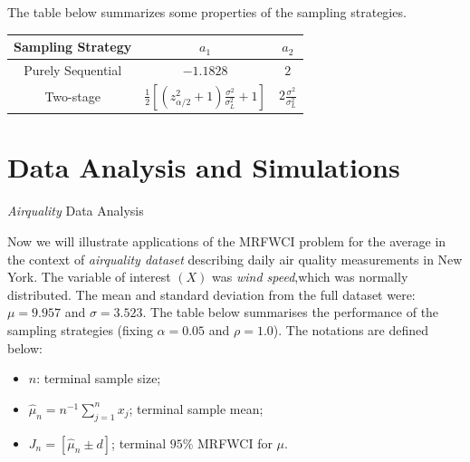 \documentclass [xcolor=svgnames, t] {beamer}
\begin{document}
\begin{frame}{}
    \vspace{20mm}
    The table below summarizes some properties of the sampling strategies.
\begin{center}
\begin{tabular}{c c c} 
 \hline
 Sampling Strategy & $a_1$ & $a_2$ \\
 \hline
 Purely Sequential & $-1.1828$ & $2$  \\ 
 Two-stage & $\frac{1}{2}[(z^2_{\alpha/2}+1)\frac{\sigma^2}{\sigma^2_L}+1]$ & $2\frac{\sigma^2}{\sigma^2_L}$ \\
 \hline
\end{tabular}
\end{center}
\end{frame}
\section{Data Analysis and Simulations}
\begin{frame}{\textit{Airquality} Data Analysis}

Now we will illustrate applications of the MRFWCI problem for the average in the context of \textit{airquality dataset} describing daily air quality measurements in New York. The variable of interest $(X)$ was \textit{wind speed},which was normally distributed. The mean and standard deviation from the full dataset were: $\mu = 9.957$ and $\sigma = 3.523$. The table below summarises the performance of the sampling strategies (fixing $\alpha=0.05$ and $\rho=1.0$). The notations are defined below:
\begin{itemize}
\item $n$: terminal sample size;
\item $\hat{\mu}_n=n^{-1}\sum_{j=1}^n{x_j}$; terminal sample mean;
\item $J_n=[\hat{\mu}_n \pm d]$; terminal $95\%$ MRFWCI for $\mu$.
\end{itemize}
    
\end{frame}
\end{document}
